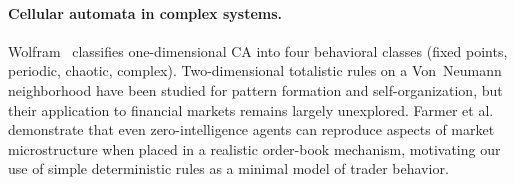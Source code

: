 \paragraph{Cellular automata in complex systems.}
Wolfram~\cite{wolfram2002new} classifies one-dimensional CA into four behavioral
classes (fixed points, periodic, chaotic, complex). Two-dimensional totalistic rules
on a Von~Neumann neighborhood have been studied for pattern formation and
self-organization, but their application to financial markets remains largely
unexplored. Farmer et al.~\cite{farmer2005predictive} demonstrate that even
zero-intelligence agents can reproduce aspects of market microstructure when placed
in a realistic order-book mechanism, motivating our use of simple deterministic rules
as a minimal model of trader behavior.
